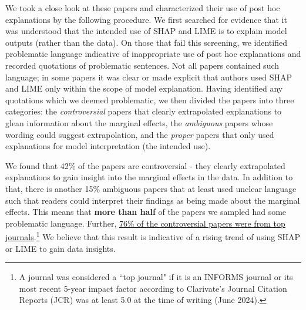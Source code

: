 \documentclass[mnsc,blindrev]{informs3}
\begin{document}
        
        We took a close look at these papers and characterized their use of post hoc explanations by the following procedure. We first searched for evidence that it was understood that the intended use of SHAP and LIME is to explain model outputs (rather than the data). On those that fail this screening, we identified problematic language indicative of inappropriate use of post hoc explanations and recorded quotations of problematic sentences.
        Not all papers contained such language; in some papers it was clear or made explicit that authors used SHAP and LIME only within the scope of model explanation. Having identified any quotations which we deemed problematic, we then divided the papers into three categories: the \textit{controversial} papers that clearly extrapolated explanations to glean information about the marginal effects, the \textit{ambiguous} papers whose wording could suggest extrapolation, and the \textit{proper} papers that only used explanations for model interpretation (the intended use).%

        We found that 42\% of the papers are controversial - they clearly extrapolated explanations to gain insight into the marginal effects in the data. In addition to that, there is another 15\% ambiguous papers that at least used unclear language such that readers could interpret their findings as being made about the marginal effects. This means that \textbf{more than half} of the papers we sampled had some problematic language. Further, \underline{76\% of the controversial papers were from top journals}.\footnote{A journal was considered a ``top journal" if it is an INFORMS journal or its most recent 5-year impact factor according to Clarivate's Journal Citation Reports (JCR) was at least 5.0 at the time of writing (June 2024).}
        We believe that this result is indicative of a rising trend of using SHAP or LIME to gain data insights.
\end{document}

